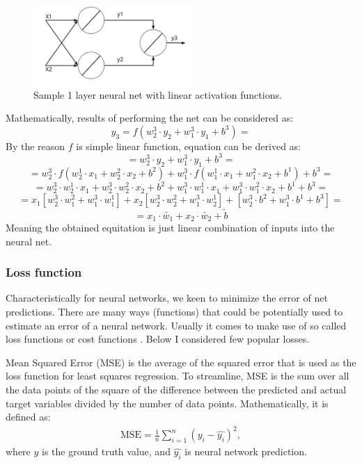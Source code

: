 \begin{figure}[h]
    \centering \includegraphics[width=6cm]{images/3_neurons_net.jpeg}
    \caption {Sample 1 layer neural net with linear activation functions.}
    \label{fig:1_layer_net}
\end{figure}

Mathematically, results of performing the net can be considered as:
\[ y_3 = f(w_2^3 \cdot y_2+w_1^3 \cdot y_1+b^3) = \]
By the reason $f$ is simple linear function, equation can be derived as:
\[ = w_2^3 \cdot y_2+w_1^3 \cdot y_1+b^3 = \] 
\[ = w_2^3 \cdot f(w_2^1\cdot x_1+w_2^2 \cdot x_2+b^2) + w_1^3 \cdot f(w_1^1 \cdot x_1+w_1^2 \cdot x_2+b^1) + b^3 = \]   
\[ = w_2^3 \cdot w_2^1 \cdot x_1+w_2^3 \cdot w_2^2 \cdot x_2+b^2 + w_1^3 \cdot w_1^1 \cdot x_1+w_1^3 \cdot w_1^2 \cdot x_2+b^1+b^3 = \]
\[ = x_1[w_2^3 \cdot w_1^2 + w_1^3 \cdot w_1^1] + x_2[w_2^3 \cdot w_2^2 + w_1^3 \cdot w_2^1] + [w_2^3 \cdot b^2+w_1^3 \cdot b^1+b^3] = \]
\[ =  x_1\cdot \tilde{w_1} + x_2\cdot \tilde{w_2} + \tilde{b} \]
Meaning the obtained equitation is just linear combination of inputs into the neural net. 

\subsubsection{Loss function}
Characteristically for neural networks, we keen to minimize the error of net predictions. There are many ways (functions) that could be potentially used to estimate an error of a neural network. Usually it comes to make use of so called loss functions or cost functions \cite{Janocha2016}. Below I considered few popular losses.

Mean Squared Error (MSE) is the average of the squared error that is used as the loss function for least squares regression. To streamline, MSE is the sum over all the data points of the square of the difference between the predicted and actual target variables divided by the number of data points. Mathematically, it is defined as:
\begin{align*}
\text{MSE} = \frac{{1}}{n} \sum_{i=1}^{n} (y_i - \hat{y_i})^2,
\end{align*}
where $y$ is the ground truth value, and $\hat{y_i}$ is neural network prediction.

